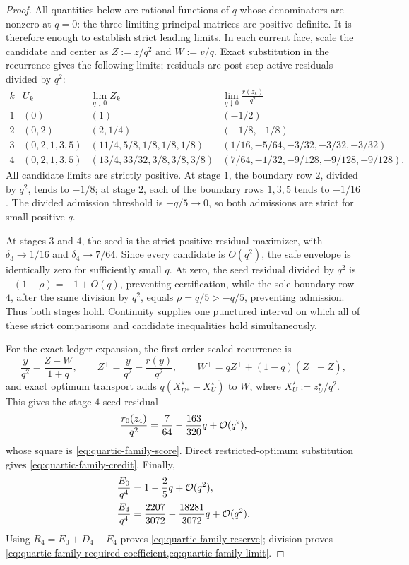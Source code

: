 \begin{proof}
All quantities below are rational functions of $q$ whose denominators are
nonzero at $q=0$: the three limiting principal matrices are positive
definite.  It is therefore enough to establish strict leading limits.  In
each current face, scale the candidate and center as
$Z:=z/q^2$ and $W:=v/q$.  Exact substitution in the recurrence gives the
following limits; residuals are post-step active residuals divided by $q^2$:
\begin{equation*}
\begin{array}{c|c|c|c}
k & U_k & \displaystyle\lim_{q\downarrow0}Z_k
& \displaystyle\lim_{q\downarrow0}\frac{r(z_k)}{q^2}\\ \hline
1 &(0) &(1) &(-1/2)\\
2 &(0,2) &(2,1/4) &(-1/8,-1/8)\\
3 &(0,2,1,3,5) &(11/4,5/8,1/8,1/8,1/8)
 &(1/16,-5/64,-3/32,-3/32,-3/32)\\
4 &(0,2,1,3,5) &(13/4,33/32,3/8,3/8,3/8)
 &(7/64,-1/32,-9/128,-9/128,-9/128).
\end{array}
\end{equation*}
All candidate limits are strictly positive.  At stage $1$, the boundary row
$2$, divided by $q^2$, tends to $-1/8$; at stage $2$, each of the boundary
rows $1,3,5$ tends to $-1/16$.  The divided admission threshold is
$-q/5\to0$, so both admissions are strict for small positive $q$.

At stages $3$ and $4$, the seed is the strict positive residual maximizer,
with $\delta_3\to1/16$ and $\delta_4\to7/64$.  Since every candidate is
$O(q^2)$, the safe envelope is identically zero for sufficiently small $q$.
At zero, the seed residual divided by $q^2$ is
$-(1-\rho)=-1+O(q)$, preventing certification, while the sole boundary row
$4$, after the same division by $q^2$, equals
$\rho=q/5>-q/5$, preventing admission.  Thus both stages hold.
Continuity supplies one punctured interval on which all of these strict
comparisons and candidate inequalities hold simultaneously.

For the exact ledger expansion, the first-order scaled recurrence is
\begin{equation*}
 \frac{y}{q^2}=\frac{Z+W}{1+q},\qquad
 Z^+=\frac{y}{q^2}-\frac{r(y)}{q^2},\qquad
 W^+=qZ^++(1-q)(Z^+-Z),
\end{equation*}
and exact optimum transport adds
$q(X_{U^+}^\star-X_U^\star)$ to $W$, where
$X_U^\star:=z_U^\star/q^2$.  This gives the stage-$4$ seed residual
\begin{equation*}
 \frac{r_0(z_4)}{q^2}=\frac7{64}-\frac{163}{320}q+\mathcal{O}(q^2),
\end{equation*}
whose square is \cref{eq:quartic-family-score}.  Direct restricted-optimum
substitution gives \cref{eq:quartic-family-credit}.  Finally,
\begin{align*}
 \frac{E_0}{q^4}
 &=1-\frac25q+\mathcal{O}(q^2),\\
 \frac{E_4}{q^4}
 &=\frac{2207}{3072}-\frac{18281}{3072}q+\mathcal{O}(q^2).
\end{align*}
Using $R_4=E_0+D_4-E_4$ proves
\cref{eq:quartic-family-reserve}; division proves
\cref{eq:quartic-family-required-coefficient,eq:quartic-family-limit}.
\end{proof}

